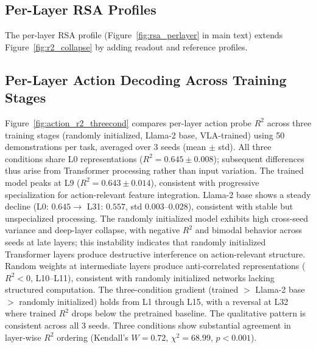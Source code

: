 \subsection{Per-Layer RSA Profiles}
The per-layer RSA profile (Figure~\ref{fig:rsa_perlayer} in main text) extends Figure~\ref{fig:r2_collapse} by adding readout and reference profiles.

\subsection{Per-Layer Action Decoding Across Training Stages}
\label{sec:action_r2_threecond}

Figure~\ref{fig:action_r2_threecond} compares per-layer action probe $R^2$ across three training stages (randomly initialized, Llama-2 base, VLA-trained) using 50 demonstrations per task, averaged over 3 seeds (mean $\pm$ std).
All three conditions share L0 representations ($R^2 = 0.645 \pm 0.008$); subsequent differences thus arise from Transformer processing rather than input variation.
The trained model peaks at L9 ($R^2 = 0.643 \pm 0.014$), consistent with progressive specialization for action-relevant feature integration.
Llama-2 base shows a steady decline (L0: $0.645 \to$ L31: $0.557$, std $0.003$--$0.028$), consistent with stable but unspecialized processing.
The randomly initialized model exhibits high cross-seed variance and deep-layer collapse, with negative $R^2$ and bimodal behavior across seeds at late layers; this instability indicates that randomly initialized Transformer layers produce destructive interference on action-relevant structure.
Random weights at intermediate layers produce anti-correlated representations ($R^2 < 0$, L10--L11), consistent with randomly initialized networks lacking structured computation.
The three-condition gradient (trained $>$ Llama-2 base $>$ randomly initialized) holds from L1 through L15, with a reversal at L32 where trained $R^2$ drops below the pretrained baseline.
The qualitative pattern is consistent across all 3 seeds.
Three conditions show substantial agreement in layer-wise $R^2$ ordering (Kendall's $W = 0.72$, $\chi^2 = 68.99$, $p < 0.001$).


